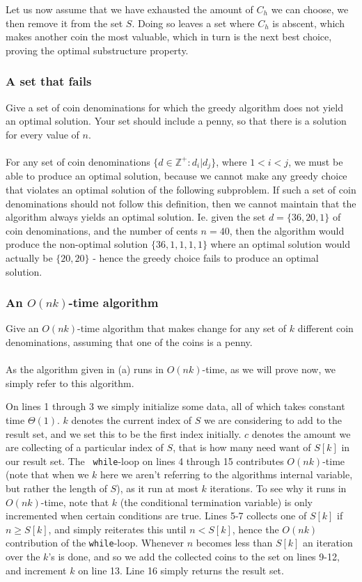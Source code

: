 \documentclass[11pt,english]{article}
\begin{document}
Let us now assume that we have exhausted the amount of $C_h$ we can choose,
we then remove it from the set $S$. Doing so leaves a set where $C_h$ is
abscent, which makes another coin the most valuable, which in turn is the
next best choice, proving the optimal substructure property.

\newpage
\subsubsection*{A set that fails}
\large{Give a set of coin denominations for which the greedy algorithm
does not yield an optimal solution. Your set should include a penny, so
that there is a solution for every value of $n$.}
\\\\
For any set of coin denominations
$\{d \in \mathbb{Z}^{+} : d_i | d_{j}\}$, where $1 < i < j$, we must be able to
produce an optimal solution, because we cannot make any greedy choice that
violates an optimal solution of the following subproblem. If such a set of
coin denominations should not follow this definition, then we cannot maintain
that the algorithm always yields an optimal solution. Ie. given the set
$d = \{36, 20, 1\}$ of coin denominations, and the number of cents $n = 40$,
then the algorithm would produce the non-optimal solution $\{36, 1, 1, 1, 1\}$
where an optimal solution would actually be $\{20, 20\}$ - hence the greedy
choice fails to produce an optimal solution.

\subsubsection*{An $O(nk)$-time algorithm}
\large{Give an $O(nk)$-time algorithm that makes change for any set of $k$
different coin denominations, assuming that one of the coins is a penny.}
\\\\
As the algorithm given in (a) runs in $O(nk)$-time, as we will prove now, we
simply refer to this algorithm.

On lines 1 through 3 we simply initialize some data, all of which takes
constant time $\Theta(1)$. $k$ denotes the current index of $S$ we are
considering to add to the result set, and we set this to be the first index
initially. $c$ denotes the amount we are collecting of a particular index of
$S$, that is how many need want of $S[k]$ in our result set. The \texttt{
while}-loop on lines 4 through 15 contributes $O(nk)$-time (note that when we
$k$ here we aren't referring to the algorithms internal variable, but rather
the length of $S$), as it run at most $k$ iterations. To see why it runs in
$O(nk)$-time, note that $k$ (the conditional termination variable) is only
incremented when certain conditions are true. Lines 5-7 collects one of $S[k]$
if $n \geq S[k]$, and simply reiterates this until $n < S[k]$, hence the
$O(nk)$ contribution of the \texttt{while}-loop. Whenever $n$ becomes less
than $S[k]$ an iteration over the $k$'s is done, and so we add the collected
coins to the set on lines 9-12, and increment $k$ on line 13. Line 16 simply
returns the result set.
\end{document}
